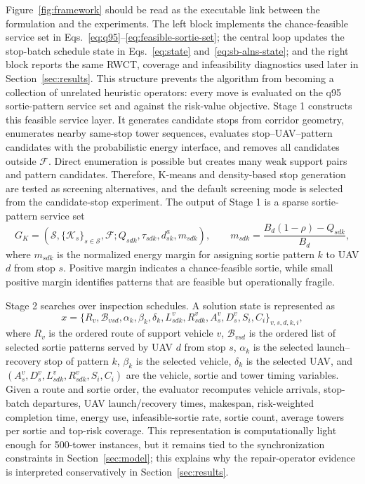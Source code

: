 Figure~\ref{fig:framework} should be read as the executable link between the formulation and the experiments. The left block implements the chance-feasible service set in Eqs.~\eqref{eq:q95}--\eqref{eq:feasible-sortie-set}; the central loop updates the stop-batch schedule state in Eqs.~\eqref{eq:state} and~\eqref{eq:sb-alns-state}; and the right block reports the same RWCT, coverage and infeasibility diagnostics used later in Section~\ref{sec:results}. This structure prevents the algorithm from becoming a collection of unrelated heuristic operators: every move is evaluated on the q95 sortie-pattern service set and against the risk-value objective. Stage 1 constructs this feasible service layer. It generates candidate stops from corridor geometry, enumerates nearby same-stop tower sequences, evaluates stop--UAV--pattern candidates with the probabilistic energy interface, and removes all candidates outside $\mathcal{F}$. Direct enumeration is possible but creates many weak support pairs and pattern candidates. Therefore, K-means and density-based stop generation are tested as screening alternatives, and the default screening mode is selected from the candidate-stop experiment. The output of Stage 1 is a sparse sortie-pattern service set
\begin{equation}
G_K=(\mathcal{S},\{\mathcal{K}_s\}_{s\in\mathcal{S}},\mathcal{F}; Q_{sdk},\tau_{sdk},d^a_{sk},m_{sdk}),
\qquad
m_{sdk}=\frac{B_d(1-\rho)-Q_{sdk}}{B_d},
\label{eq:service-graph}
\end{equation}
where $m_{sdk}$ is the normalized energy margin for assigning sortie pattern $k$ to UAV $d$ from stop $s$. Positive margin indicates a chance-feasible sortie, while small positive margin identifies patterns that are feasible but operationally fragile.

Stage 2 searches over inspection schedules. A solution state is represented as
\begin{equation}
x=\{R_v,\mathcal{B}_{vsd},\alpha_k,\beta_k,\delta_k,L^v_{sdk},R^v_{sdk},A^v_s,D^v_s,S_i,C_i\}_{v,s,d,k,i},
\label{eq:state}
\end{equation}
where $R_v$ is the ordered route of support vehicle $v$, $\mathcal{B}_{vsd}$ is the ordered list of selected sortie patterns served by UAV $d$ from stop $s$, $\alpha_k$ is the selected launch--recovery stop of pattern $k$, $\beta_k$ is the selected vehicle, $\delta_k$ is the selected UAV, and $(A^v_s,D^v_s,L^v_{sdk},R^v_{sdk},S_i,C_i)$ are the vehicle, sortie and tower timing variables. Given a route and sortie order, the evaluator recomputes vehicle arrivals, stop-batch departures, UAV launch/recovery times, makespan, risk-weighted completion time, energy use, infeasible-sortie rate, sortie count, average towers per sortie and top-risk coverage. This representation is computationally light enough for 500-tower instances, but it remains tied to the synchronization constraints in Section~\ref{sec:model}; this explains why the repair-operator evidence is interpreted conservatively in Section~\ref{sec:results}.

